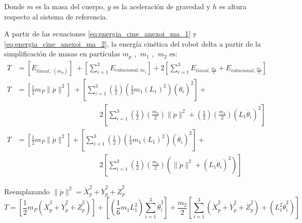                 Donde  \( m \)  es la masa del cuerpo,  \( g \)  es la aceleración de gravedad y  \( h \)  es altura respecto al sistema de referencia.
                
                A partir de las ecuaciones \ref{eq:energia_cine_anexoi_ma_1} y \ref{eq:energia_cine_anexoi_ma_2}, la energía cinética del robot delta a partir de la simplificación de masas en partículas  \( m_{p} \) , \( ~m_{1} \) , \( ~m_{2} \)  es:
\begin{align*}
                 T&= \left[ E_{lineal,~  \left( m_{p} \right) } \right] ~ + \left[  \sum _{i=1}^{3}E_{rotacional,m_{1} } \right] +2 \left[  \sum _{i=1}^{3}E_{lineal, \frac{m_{2}}{2}}+E_{rotacional,\frac{m_{2}}{2}} \right] \\
                 T&= \left[ \frac{1}{2}m_{P}\parallel \dot{p} \parallel^{2} \right] ~ + \left[  \sum _{i=1}^{3} \left( \frac{1}{2} \right)  \left( \frac{1}{3}m_{1} \left( L_{1} \right)  ^{2} \right)  \left( \dot{ \theta }_{i} \right) ^{2} \right]+ \\
                 &~~~~~~~~~~~~~~~~~~~~~~~~~~~~~~~~~~~~~~~~~~~~~~~~~~~~ 2 \left[  \sum _{i=1}^{3} \left( \frac{1}{2} \right)  \left( \frac{m_{2}}{2} \right) \parallel \dot{p} \parallel^{2}+  \left( \frac{1}{2} \right)  \left( \frac{m_{2}}{2} \right)  \left( L_{1}\dot{ \theta }_{i} \right) ^{2} \right]\\
                 T&= \left[ \frac{1}{2}m_{P}\parallel \dot{p} \parallel^{2} \right]+ \left[  \sum _{i=1}^{3} \left( \frac{1}{2} \right)  \left( \frac{1}{3}m_{1} \left( L_{1} \right)  ^{2} \right)  \left( \dot{ \theta }_{i} \right) ^{2} \right]+\\
                 &~~~~~~~~~~~~~~~~~~~~~~~~~~~~~~~~~~~~~~~~~~~~~~~~~~~~2 \left[  \sum _{i=1}^{3} \left( \frac{1}{2} \right)  \left( \frac{m_{2}}{2} \right)  \left( \parallel \dot{p} \parallel^{2}+  \left( L_{1}\dot{ \theta }_{i} \right) ^{2} \right)  \right] 
\end{align*}

                Reemplazando $\parallel\dot{p}\parallel^{2}=\dot{X}_{p}^{2}+\dot{Y}_{p}^{2}+\dot{Z}_{p}^{2}$
                \begin{equation}
                     T= \left[ \frac{1}{2}m_{P} \left( \dot{X}_{p}^{2}+\dot{Y}_{p}^{2}+\dot{Z}_{p}^{2} \right)  \right] + \left[  \left( \frac{1}{6}m_{1}L_{1}^{2} \right)  \sum _{i=1}^{3} \dot{ \theta }_{i}^{2} \right] + \frac{m_{2}}{2} \left[  \sum _{i=1}^{3} \left( \dot{X}_{p}^{2}+\dot{Y}_{p}^{2}+\dot{Z}_{p}^{2} \right) + \left( L_{1}^{2}\dot{ \theta }_{i}^{2} \right)  \right]
                \end{equation}
                
